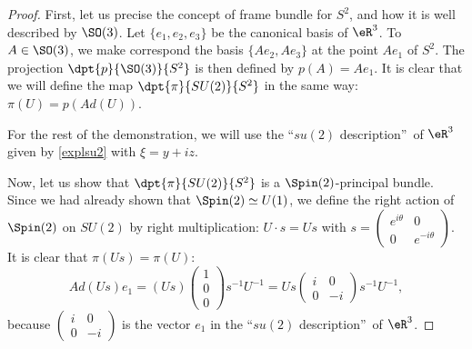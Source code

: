 \begin{proof}
	First, let us precise the concept of frame bundle for $S^2$, and how it is well described by $\SO(3)$. Let $\{e_1,e_2,e_3\}$ be the canonical basis of $\eR^3$. To $A\in \SO(3)$, we make correspond the basis $\{Ae_2,Ae_3\}$ at the point $Ae_1$ of $S^2$. The projection $\dpt{p}{\SO(3)}{S^2}$ is then defined by $p(A)=Ae_1$. It is clear that we will  define the map $\dpt{\pi}{SU(2)}{S^2}$ in the same way: $\pi(U)=p(Ad(U))$.

	For the rest of the demonstration, we will use the ``$su(2)$ description''\ of $\eR^3$ given by \eqref{explsu2} with $\xi=y+iz$.

	Now, let us show that $\dpt{\pi}{SU(2)}{S^2}$ is a $\Spin(2)$-principal bundle. Since we had already shown that $\Spin(2)\simeq U(1)$, we define the right action of $\Spin(2)$ on $SU(2)$ by right multiplication: $U\cdot s=Us$ with $s=\begin{pmatrix}
			e^{i\theta} & 0            \\
			0           & e^{-i\theta}
		\end{pmatrix}$. It is clear that $\pi(Us)=\pi(U)$:
	\begin{equation}
		Ad(Us)e_1=(Us)\begin{pmatrix}
			1 \\
			0 \\
			0
		\end{pmatrix}s^{-1} U^{-1}=Us
		\begin{pmatrix}
			i & 0  \\
			0 & -i
		\end{pmatrix}s^{-1} U^{-1},
	\end{equation}
	because $\begin{pmatrix}
			i & 0  \\
			0 & -i
		\end{pmatrix}$ is the vector $e_1$ in the ``$su(2)$ description''\ of $\eR^3$.


\end{proof}
